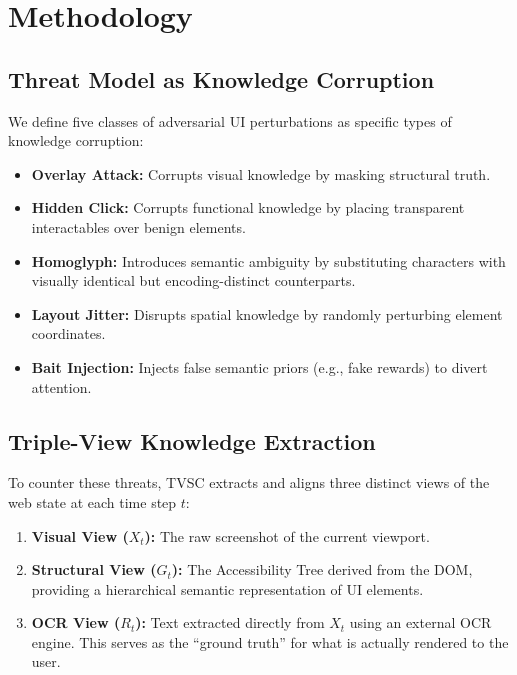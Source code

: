 \documentclass[runningheads]{llncs}
\begin{document}
\section{Methodology}

\subsection{Threat Model as Knowledge Corruption}
We define five classes of adversarial UI perturbations as specific types of knowledge corruption:
\begin{itemize}
    \item \textbf{Overlay Attack:} Corrupts visual knowledge by masking structural truth.
    \item \textbf{Hidden Click:} Corrupts functional knowledge by placing transparent interactables over benign elements.
    \item \textbf{Homoglyph:} Introduces semantic ambiguity by substituting characters with visually identical but encoding-distinct counterparts.
    \item \textbf{Layout Jitter:} Disrupts spatial knowledge by randomly perturbing element coordinates.
    \item \textbf{Bait Injection:} Injects false semantic priors (e.g., fake rewards) to divert attention.
\end{itemize}

\subsection{Triple-View Knowledge Extraction}
To counter these threats, TVSC extracts and aligns three distinct views of the web state at each time step $t$:
\begin{enumerate}
    \item \textbf{Visual View ($X_t$):} The raw screenshot of the current viewport.
    \item \textbf{Structural View ($G_t$):} The Accessibility Tree derived from the DOM, providing a hierarchical semantic representation of UI elements.
    \item \textbf{OCR View ($R_t$):} Text extracted directly from $X_t$ using an external OCR engine. This serves as the ``ground truth'' for what is actually rendered to the user.
\end{enumerate}
\end{document}
